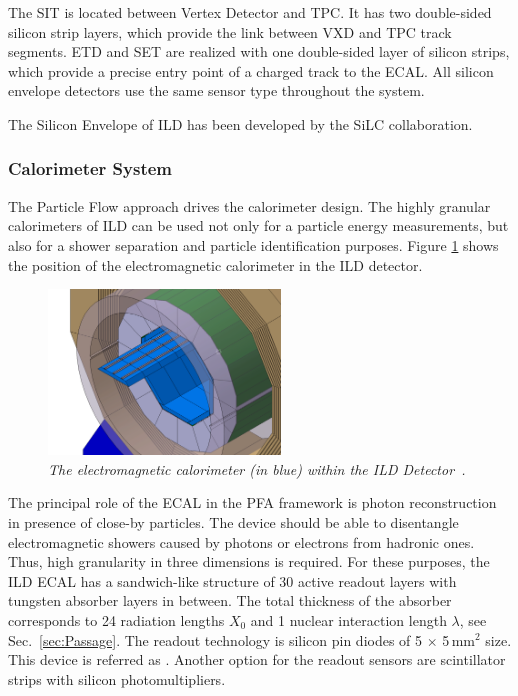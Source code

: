 The SIT is located between Vertex Detector and TPC. It has two double-sided silicon strip layers, which provide the link between VXD and TPC track segments. ETD and SET are realized with one double-sided layer of silicon strips, which provide a precise entry point of a charged track to the ECAL. All silicon envelope detectors use the same sensor type throughout the system.

The Silicon Envelope of ILD has been developed by the SiLC collaboration.

\subsubsection{Calorimeter System}

The Particle Flow approach drives the calorimeter design. The highly granular calorimeters of ILD can be used not only for a particle energy measurements, but also for a shower separation and particle identification purposes. 
Figure \ref{fig:ILCecal} shows the position of the electromagnetic calorimeter in the ILD detector.

\begin{figure}
	{\centering
		\includegraphics[width=0.55\textwidth]{graphics/ild-cal.png}
		\caption{\sl The electromagnetic calorimeter (in blue) within the ILD Detector~\cite{bib:ILC}.}
		\label{fig:ILCecal}
	}
\end{figure}

The principal role of the ECAL in the PFA framework is photon reconstruction in presence of close-by particles. The device should be able to disentangle electromagnetic showers caused by photons or electrons from hadronic ones. Thus, high granularity in three dimensions is required. For these purposes, the ILD ECAL has a sandwich-like structure of 30 active readout layers with tungsten absorber layers in between. The total thickness of the absorber corresponds to 24 radiation lengths $X_0$ and 1 nuclear interaction length $\lambda$, see Sec.~\ref{sec:Passage}. The readout technology is silicon pin diodes of 5 $\times$ 5\,mm$^2$ size. This device is referred as \ecal. Another option for the readout sensors are scintillator strips with silicon photomultipliers.

